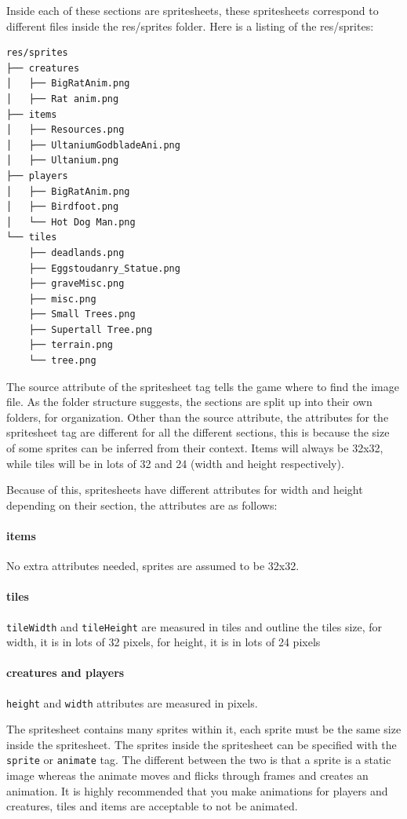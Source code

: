 \documentclass{book}
\begin{document}
Inside each of these sections are spritesheets, these spritesheets correspond to different files inside the res/sprites folder. Here is a listing of the res/sprites:

\begin{lstlisting}
res/sprites
├── creatures
│   ├── BigRatAnim.png
│   ├── Rat anim.png
├── items
│   ├── Resources.png
│   ├── UltaniumGodbladeAni.png
│   ├── Ultanium.png
├── players
│   ├── BigRatAnim.png
│   ├── Birdfoot.png
│   └── Hot Dog Man.png
└── tiles
    ├── deadlands.png
    ├── Eggstoudanry_Statue.png
    ├── graveMisc.png
    ├── misc.png
    ├── Small Trees.png
    ├── Supertall Tree.png
    ├── terrain.png
    └── tree.png
\end{lstlisting}

The source attribute of the spritesheet tag tells the game where to find the image file. As the folder structure suggests, the sections are split up into their own folders, for organization. Other than the source attribute, the attributes for the spritesheet tag are different for all the different sections, this is because the size of some sprites can be inferred from their context. Items will always be 32x32, while tiles will be in lots of 32 and 24 (width and height respectively). 

Because of this, spritesheets have different attributes for width and height depending on their section, the attributes are as follows:

\paragraph{items} No extra attributes needed, sprites are assumed to be 32x32.
\paragraph{tiles} \texttt{tileWidth} and \texttt{tileHeight} are measured in tiles and outline the tiles size, for width, it is in lots of 32 pixels, for height, it is in lots of 24 pixels
\paragraph{creatures and players} \texttt{height} and \texttt{width} attributes are measured in pixels.

The spritesheet contains many sprites within it, each sprite must be the same size inside the spritesheet. The sprites inside the spritesheet can be specified with the \texttt{sprite} or \texttt{animate} tag. The different between the two is that a sprite is a static image whereas the animate moves and flicks through frames and creates an animation. It is highly recommended that you make animations for players and creatures, tiles and items are acceptable to not be animated.
\end{document}
